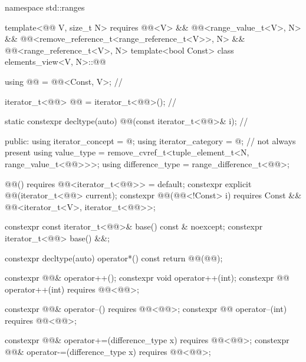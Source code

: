 %
\begin{codeblock}
namespace std::ranges {
  template<@@ V, size_t N>
    requires @@<V> && @@<range_value_t<V>, N> &&
             @@<remove_reference_t<range_reference_t<V>>, N> &&
             @@<range_reference_t<V>, N>
  template<bool Const>
  class elements_view<V, N>::@@ {
    using @@ = @@<Const, V>;                 // \expos

    iterator_t<@@> @@ = iterator_t<@@>();     // \expos

    static constexpr decltype(auto) @@(const iterator_t<@@>& i);     // \expos

  public:
    using iterator_concept = @\seebelow@;
    using iterator_category = @\seebelow@;                // not always present
    using value_type = remove_cvref_t<tuple_element_t<N, range_value_t<@@>>>;
    using difference_type = range_difference_t<@@>;

    @@() requires @@<iterator_t<@@>> = default;
    constexpr explicit @@(iterator_t<@@> current);
    constexpr @@(@@<!Const> i)
      requires Const && @@<iterator_t<V>, iterator_t<@@>>;

    constexpr const iterator_t<@@>& base() const & noexcept;
    constexpr iterator_t<@@> base() &&;

    constexpr decltype(auto) operator*() const
    { return @@(@@); }

    constexpr @@& operator++();
    constexpr void operator++(int);
    constexpr @@ operator++(int) requires @@<@@>;

    constexpr @@& operator--() requires @@<@@>;
    constexpr @@ operator--(int) requires @@<@@>;

    constexpr @@& operator+=(difference_type x)
      requires @@<@@>;
    constexpr @@& operator-=(difference_type x)
      requires @@<@@>;

}}
\end{codeblock}
